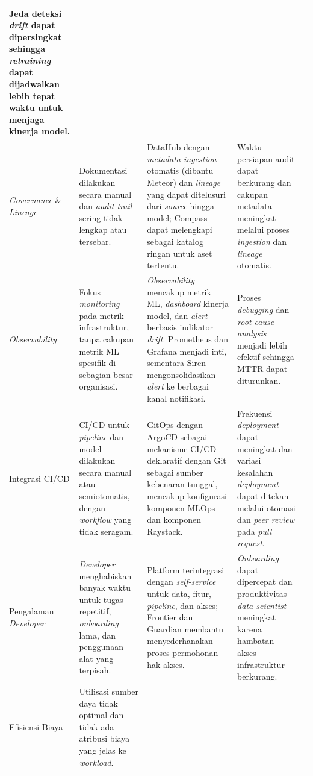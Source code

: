 {\begin{longtable}{|m{2cm}|m{2.5cm}|m{2.5cm}|m{3cm}|m{2cm}|}
Jeda deteksi \textit{drift} dapat dipersingkat sehingga \textit{retraining} dapat dijadwalkan lebih tepat waktu untuk menjaga kinerja model. &
\autocite{cespedes2024efficient,bayram2022concept} \\
\hline
\textit{Governance} \& \textit{Lineage} &
Dokumentasi dilakukan secara manual dan \textit{audit trail} sering tidak lengkap atau tersebar. &
DataHub dengan \textit{metadata ingestion} otomatis (dibantu Meteor) dan \textit{lineage} yang dapat ditelusuri dari \textit{source} hingga model; Compass dapat melengkapi sebagai katalog ringan untuk aset tertentu. &
Waktu persiapan audit dapat berkurang dan cakupan metadata meningkat melalui proses \textit{ingestion} dan \textit{lineage} otomatis. &
\autocite{stoyanovich2020responsible,lamer2024data} \\
\hline
\textit{Observability} &
Fokus \textit{monitoring} pada metrik infrastruktur, tanpa cakupan metrik ML spesifik di sebagian besar organisasi. &
\textit{Observability} mencakup metrik ML, \textit{dashboard} kinerja model, dan \textit{alert} berbasis indikator \textit{drift}. Prometheus dan Grafana menjadi inti, sementara Siren mengonsolidasikan \textit{alert} ke berbagai kanal notifikasi. &
Proses \textit{debugging} dan \textit{root cause analysis} menjadi lebih efektif sehingga MTTR dapat diturunkan. &
\autocite{shankar2022operationalizing} \\
\hline
Integrasi CI/CD &
CI/CD untuk \textit{pipeline} dan model dilakukan secara manual atau semiotomatis, dengan \textit{workflow} yang tidak seragam. &
GitOps dengan ArgoCD sebagai mekanisme CI/CD deklaratif dengan Git sebagai sumber kebenaran tunggal, mencakup konfigurasi komponen MLOps dan komponen Raystack. &
Frekuensi \textit{deployment} dapat meningkat dan variasi kesalahan \textit{deployment} dapat ditekan melalui otomasi dan \textit{peer review} pada \textit{pull request}. &
\autocite{kreuzberger2023mlops} \\
\hline
Pengalaman \textit{Developer} &
\textit{Developer} menghabiskan banyak waktu untuk tugas repetitif, \textit{onboarding} lama, dan penggunaan alat yang terpisah. &
Platform terintegrasi dengan \textit{self-service} untuk data, fitur, \textit{pipeline}, dan akses; Frontier dan Guardian membantu menyederhanakan proses permohonan hak akses. &
\textit{Onboarding} dapat dipercepat dan produktivitas \textit{data scientist} meningkat karena hambatan akses infrastruktur berkurang. &
\autocite{paleyes2022challenges,rella2022mlops} \\
\hline
Efisiensi Biaya &
Utilisasi sumber daya tidak optimal dan tidak ada atribusi biaya yang jelas ke \textit{workload}. &

\end{longtable}}
